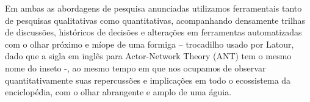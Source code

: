 Em ambas as abordagens de pesquisa anunciadas utilizamos ferramentais tanto de pesquisas qualitativas como quantitativas, acompanhando densamente trilhas de discussões, históricos de decisões e alterações em ferramentas automatizadas com o olhar próximo e míope de uma formiga – trocadilho usado por Latour, dado que a sigla em inglês para Actor-Network Theory (ANT) tem o mesmo nome do inseto -, ao mesmo tempo em que nos ocupamos de observar quantitativamente suas repercussões e implicações em todo o ecossistema da enciclopédia, com o olhar abrangente e amplo de uma águia.





% 


